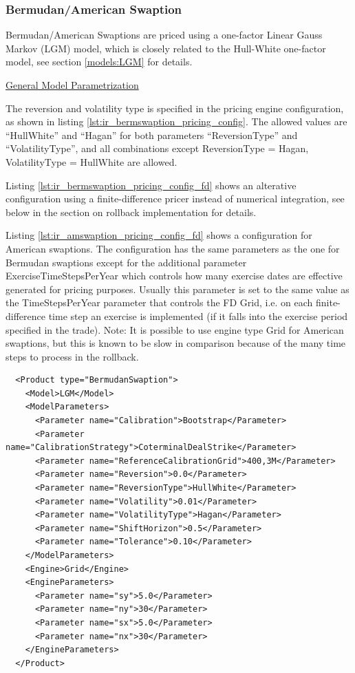 \subsubsection{Bermudan/American Swaption}
\label{pricing:ir_bermswaption}

Bermudan/American Swaptions are priced using a one-factor Linear Gauss Markov (LGM) model, which
is closely related to the Hull-White one-factor model, see section \ref{models:LGM} for details.

\underline{General Model Parametrization}

The reversion and volatility type is specified in the pricing engine configuration, as shown in listing
\ref{lst:ir_bermswaption_pricing_config}. The allowed values are ``HullWhite'' and ``Hagan'' for both parameters
``ReversionType'' and ``VolatilityType'', and all combinations except ReversionType = Hagan, VolatilityType = HullWhite
are allowed.

Listing \ref{lst:ir_bermswaption_pricing_config_fd} shows an alterative configuration using a finite-difference pricer
instead of numerical integration, see below in the section on rollback implementation for details.

Listing \ref{lst:ir_amswaption_pricing_config_fd} shows a configuration for American swaptions. The configuration has
the same parameters as the one for Bermudan swaptions except for the additional parameter ExerciseTimeStepsPerYear which
controls how many exercise dates are effective generated for pricing purposes. Usually this parameter is set to the same
value as the TimeStepsPerYear parameter that controls the FD Grid, i.e. on each finite-difference time step an exercise
is implemented (if it falls into the exercise period specified in the trade). Note: It is possible to use engine type
Grid for American swaptions, but this is known to be slow in comparison because of the many time steps to process in the
rollback.


\begin{listing}[h]
\begin{verbatim}
  <Product type="BermudanSwaption">
    <Model>LGM</Model>
    <ModelParameters>
      <Parameter name="Calibration">Bootstrap</Parameter>
      <Parameter name="CalibrationStrategy">CoterminalDealStrike</Parameter>
      <Parameter name="ReferenceCalibrationGrid">400,3M</Parameter>
      <Parameter name="Reversion">0.0</Parameter>
      <Parameter name="ReversionType">HullWhite</Parameter>
      <Parameter name="Volatility">0.01</Parameter>
      <Parameter name="VolatilityType">Hagan</Parameter>
      <Parameter name="ShiftHorizon">0.5</Parameter>
      <Parameter name="Tolerance">0.10</Parameter>
    </ModelParameters>
    <Engine>Grid</Engine>
    <EngineParameters>
      <Parameter name="sy">5.0</Parameter>
      <Parameter name="ny">30</Parameter>
      <Parameter name="sx">5.0</Parameter>
      <Parameter name="nx">30</Parameter>
    </EngineParameters>
  </Product>
\end{verbatim}
\caption{Bermudan Swaption pricing configuration Grid Engine}
\label{lst:ir_bermswaption_pricing_config}
\end{listing}

